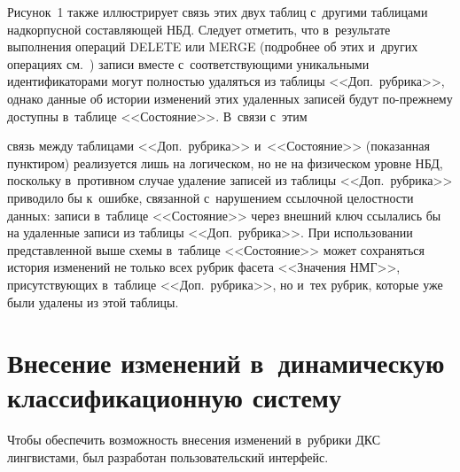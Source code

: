 \begin{multicols}{2}
\begin{figure*}
\begin{center}
\end{center}
\vspace*{-9pt}
\vspace*{-6pt}
\end{figure*}

  Рисунок~1 также иллюстрирует связь этих двух таб\-лиц с~другими 
таб\-ли\-ца\-ми надкорпусной со\-став\-ля\-ющей НБД. Следует отметить, что 
в~результате выполнения операций DELETE или MERGE (подробнее об 
этих и~других операциях см.~\cite{2-go, 3-go}) записи вместе 
с~соответствующими уникальными идентификаторами могут пол\-ностью 
удаляться из таблицы <<Доп.\ руб\-ри\-ка>>, однако данные об истории 
изменений этих удаленных записей будут по-преж\-не\-му до\-ступ\-ны в~таб\-ли\-це 
<<Состояние>>. В~связи с~этим\linebreak\vspace*{-12pt}

\pagebreak

\noindent
 связь между таб\-ли\-ца\-ми <<Доп.\ рубрика>> 
и~<<Со\-сто\-яние>> (показанная пунк\-ти\-ром) реализуется лишь
 на логическом, но не на физическом уровне НБД, поскольку в~противном 
случае удаление записей из таб\-ли\-цы <<Доп.\ руб\-ри\-ка>> приводило бы 
к~ошибке, связанной с~нарушением ссылочной це\-лост\-ности данных: записи 
в~таб\-ли\-це <<Со\-сто\-яние>> через внеш\-ний ключ ссылались бы на удаленные 
записи из таб\-ли\-цы <<Доп.\ руб\-ри\-ка>>. При использовании представленной 
выше схемы в~таб\-ли\-це <<Со\-сто\-яние>> может сохраняться история 
изменений не только всех руб\-рик фасета <<Значения НМГ>>, 
присутствующих в~таб\-ли\-це <<Доп.\ руб\-ри\-ка>>, но и~тех руб\-рик, которые 
уже были удалены из этой таб\-лицы.

\section{Внесение изменений в~динамическую 
классификационную систему}

  Чтобы обеспечить возможность внесения изменений в~руб\-ри\-ки ДКС 
лингвистами, был разработан пользовательский интерфейс.

  \begin{figure*} %
  \vspace*{1pt}
  \begin{center}  
    \mbox{%
\epsfxsize=163mm
}


\end{center}
\end{figure*}
\end{multicols}
